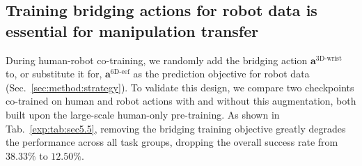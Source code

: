\documentclass{llmxive}
\begin{document}
\begin{table}[htbp]
\centering
{}
\label{exp:tab:sec5.4}
\caption{
    \textbf{Post-training data efficiency comparison after human-only pre-training.}
    Though the model is only exposed to non-executable human actions $\mathbf{a}_{t}^{\text{3D-wrist}}$ during pre-training, we can efficiently improve the data efficiency for few-shot robot post-training.
}
\end{table}








\subsection{Training bridging actions for robot data is essential for manipulation transfer}
\label{sec:exp:bridging_tasks}

%
During human-robot co-training, we randomly add the bridging action $\mathbf{a}^{\text{3D-wrist}}$ to, or substitute it for, $\mathbf{a}^{\text{6D-eef}}$ as the prediction objective for robot data (Sec.~\ref{sec:method:strategy}).
% 
To validate this design, we compare two checkpoints co-trained on human and robot actions with and without this augmentation, both built upon the large-scale human-only pre-training.
% 
As shown in Tab.~\ref{exp:tab:sec5.5}, removing the bridging training objective greatly degrades the performance across all task groups, dropping the overall success rate from $38.33\%$ to $12.50\%$.
\end{document}
